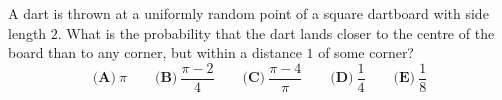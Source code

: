 A dart is thrown at a uniformly random point of a square dartboard with side length $2$. What is the probability that the dart lands closer to the centre of the board than to any corner, but within a distance $1$ of some corner?
\[
\textbf{(A)}\ \pi\qquad\textbf{(B)}\ \dfrac{\pi-2}{4}\qquad\textbf{(C)}\ \dfrac{\pi-4}{\pi}\qquad\textbf{(D)}\ \dfrac{1}{4}\qquad\textbf{(E)}\ \dfrac{1}{8}
\]
